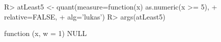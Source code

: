 \begin{Schunk}
% --begin: "quant1"
\begin{Sinput}
R> atLeast5 <- quant(measure=function(x) as.numeric(x >= 5),
+                    relative=FALSE,
+                    alg='lukas')
R> args(atLeast5)
\end{Sinput}
\begin{Soutput}
function (x, w = 1) 
NULL
\end{Soutput}
%
% --end: "quant1"
\end{Schunk}
